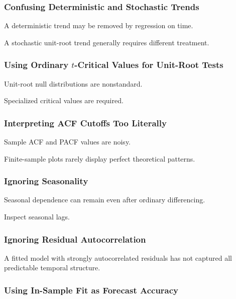 \subsubsection{Confusing Deterministic and Stochastic Trends}

A deterministic trend may be removed by regression on time.

A stochastic unit-root trend generally requires different treatment.

\subsubsection{Using Ordinary \(t\)-Critical Values for Unit-Root Tests}

Unit-root null distributions are nonstandard.

Specialized critical values are required.

\subsubsection{Interpreting ACF Cutoffs Too Literally}

Sample ACF and PACF values are noisy.

Finite-sample plots rarely display perfect theoretical patterns.

\subsubsection{Ignoring Seasonality}

Seasonal dependence can remain even after ordinary differencing.

Inspect seasonal lags.

\subsubsection{Ignoring Residual Autocorrelation}

A fitted model with strongly autocorrelated residuals has not captured
all predictable temporal structure.

\subsubsection{Using In-Sample Fit as Forecast Accuracy}


